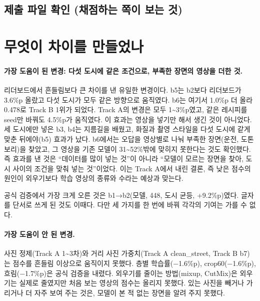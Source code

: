 \documentclass[11pt]{article}
\begin{document}
\subsection*{제출 파일 확인 (채점하는 쪽이 보는 것)}

\section*{무엇이 차이를 만들었나}

\paragraph{가장 도움이 된 변경: 다섯 도시에 같은 조건으로, 부족한 장면의 영상을 더한 것.}
리더보드에서 흔들림보다 큰 차이를 낸 유일한 변경이다. b5는 b2보다 리더보드가 3.6\%p 올랐고 다섯 도시가 모두 같은 방향으로 움직였다. b6는 여기서 1.0\%p 더 올라 0.478로 Track B 1위가 되었다. Track A의 변경은 모두 1\textasciitilde 3\%p였고, 같은 레시피를 seed만 바꿔도 4.5\%p가 움직였다. 이 효과는 영상을 넣기만 해서 생긴 것이 아니었다. 세 도시에만 넣은 b3, b4는 지름길을 배웠고, 화질과 촬영 스타일을 다섯 도시에 같게 맞춘 뒤에야(b5) 효과가 났다. b6에서는 오답을 영상별로 나눠 부족한 장면(운전, 도톤보리)을 찾았고, 그 영상을 기존 모델이 31\textasciitilde 52\%밖에 맞히지 못한다는 것도 확인했다. 즉 효과를 낸 것은 ``데이터를 많이 넣는 것''이 아니라 ``모델이 모르는 장면을 찾아, 도시 사이의 조건을 맞춰 넣는 것''이었다. 이는 Track A에서 내린 결론, 즉 낮은 점수의 원인이 외우기보다 학습 영상의 종류와 수라는 예상과 맞는다.

공식 검증에서 가장 크게 오른 것은 b1→b2(모델, 448, 도시 균등, +9.2\%p)였다. 글자를 단서로 쓰게 된 것도 이때다. 다만 세 가지를 한 번에 바꿔 각각의 기여는 가를 수 없다.

\paragraph{가장 도움이 안 된 변경.}
사진 정제(Track A 1\textasciitilde 3차)와 거리 사진 가중치(Track A clean\_street, Track B b7)는 점수를 흔들림 이상으로 움직이지 못했다. 층별 학습률(−1.6\%p), crop60(−1.6\%p), 흐림(−1.7\%p)은 공식 검증을 내렸다. 외우기를 줄이는 방법(mixup, CutMix)은 외우기는 실제로 줄였지만 처음 보는 영상의 점수는 올리지 못했다. 있는 사진을 빼거나 가리거나 더 자주 보여 주는 것은, 모델이 본 적 없는 장면을 알려 주지 못했다.
\end{document}
